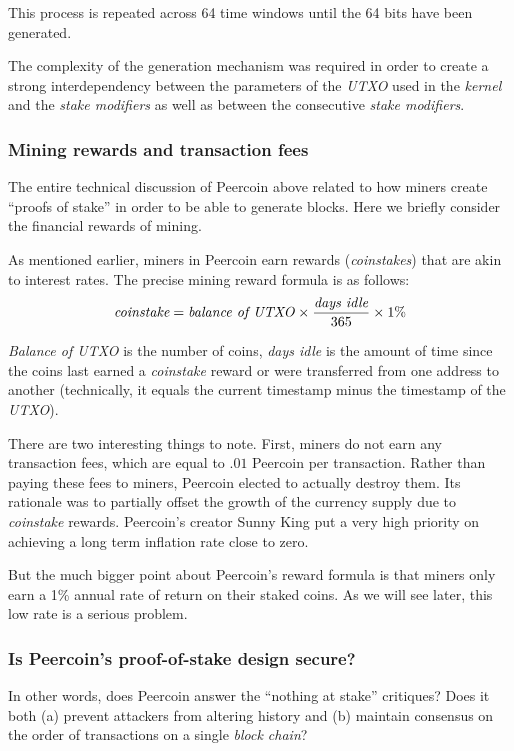 \documentclass[a4paper,11pt]{article}
\begin{document}
This process is repeated across 64 time windows until the 64 bits have been generated. 

The complexity of the generation mechanism was required in order to create a strong interdependency between the parameters of the \textit{UTXO} used in the \textit{kernel} and the \textit{stake modifiers} as well as between the consecutive \textit{\textit{stake modifiers}}.

\subsubsection*{Mining rewards and transaction fees}

The entire technical discussion of Peercoin above related to how miners create ``proofs of stake'' in order to be able to generate blocks. Here we briefly consider the financial rewards of mining. 

As mentioned earlier, miners in Peercoin earn rewards (\textit{coinstakes}) that are akin to interest rates. The precise mining reward formula is as follows:
$$ \textit{coinstake} = \text{\textit{balance of \textit{UTXO}}}\times \frac{ \text{\textit{days idle}} }{365}\times 1\% $$

\textit{Balance of \textit{UTXO}} is the number of coins, \textit{days idle} is the amount of time since the coins last earned a \textit{coinstake} reward or were transferred from one address to another (technically, it equals the current timestamp minus the timestamp of the \textit{UTXO}). 

There are two interesting things to note. First, miners do not earn any transaction fees, which are equal to $.01$ Peercoin per transaction. Rather than paying these fees to miners, Peercoin elected to actually destroy them. Its rationale was to partially offset the growth of the currency supply due to \textit{coinstake} rewards. Peercoin's creator Sunny King put a very high priority on achieving a long term inflation rate close to zero.

But the much bigger point about Peercoin's reward formula is that miners only earn a 1\% annual rate of return on their staked coins. As we will see later, this low rate is a serious problem.

\subsubsection*{Is Peercoin's proof-of-stake design secure?}

In other words, does Peercoin answer the ``nothing at stake'' critiques? Does it both (a) prevent attackers from altering history and (b) maintain consensus on the order of transactions on a single \textit{block chain}?
\end{document}
